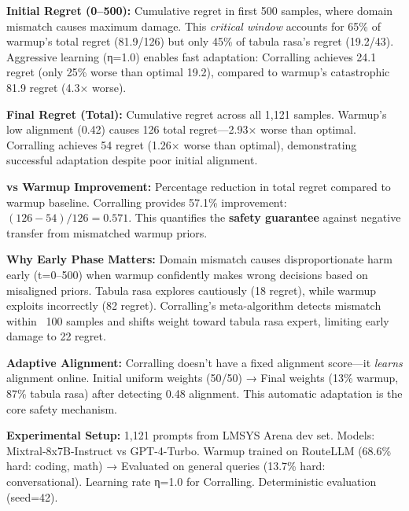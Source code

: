 \begin{table}[t]
\begin{tablenotes}
\item \textbf{Initial Regret (0--500):} Cumulative regret in first 500 samples, where domain mismatch causes maximum damage. This \emph{critical window} accounts for 65\% of warmup's total regret (81.9/126) but only 45\% of tabula rasa's regret (19.2/43). Aggressive learning (η=1.0) enables fast adaptation: Corralling achieves 24.1 regret (only 25\% worse than optimal 19.2), compared to warmup's catastrophic 81.9 regret (4.3× worse).

\item \textbf{Final Regret (Total):} Cumulative regret across all 1,121 samples. Warmup's low alignment (0.42) causes 126 total regret—2.93× worse than optimal. Corralling achieves 54 regret (1.26× worse than optimal), demonstrating successful adaptation despite poor initial alignment.

\item \textbf{vs Warmup Improvement:} Percentage reduction in total regret compared to warmup baseline. Corralling provides 57.1\% improvement: $(126-54)/126 = 0.571$. This quantifies the \textbf{safety guarantee} against negative transfer from mismatched warmup priors.

\item \textbf{Why Early Phase Matters:} Domain mismatch causes disproportionate harm early (t=0--500) when warmup confidently makes wrong decisions based on misaligned priors. Tabula rasa explores cautiously (18 regret), while warmup exploits incorrectly (82 regret). Corralling's meta-algorithm detects mismatch within ~100 samples and shifts weight toward tabula rasa expert, limiting early damage to 22 regret.

\item \textbf{Adaptive Alignment:} Corralling doesn't have a fixed alignment score—it \emph{learns} alignment online. Initial uniform weights (50/50) → Final weights (13\% warmup, 87\% tabula rasa) after detecting 0.48 alignment. This automatic adaptation is the core safety mechanism.

\item \textbf{Experimental Setup:} 1,121 prompts from LMSYS Arena dev set. Models: Mixtral-8x7B-Instruct vs GPT-4-Turbo. Warmup trained on RouteLLM (68.6\% hard: coding, math) → Evaluated on general queries (13.7\% hard: conversational). Learning rate η=1.0 for Corralling. Deterministic evaluation (seed=42).
\end{tablenotes}
\end{table}


